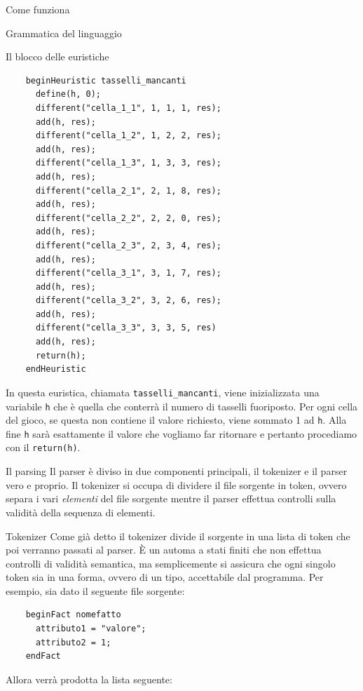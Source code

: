 \begin{chapter}{Come funziona}
\begin{section}{Grammatica del linguaggio}
\begin{subsection}{Il blocco delle euristiche}
    \begin{verbatim}
	beginHeuristic tasselli_mancanti
	  define(h, 0);
	  different("cella_1_1", 1, 1, 1, res);
	  add(h, res);
	  different("cella_1_2", 1, 2, 2, res);
	  add(h, res);
	  different("cella_1_3", 1, 3, 3, res);
	  add(h, res);
	  different("cella_2_1", 2, 1, 8, res);
	  add(h, res);
	  different("cella_2_2", 2, 2, 0, res);
	  add(h, res);
	  different("cella_2_3", 2, 3, 4, res);
	  add(h, res);
	  different("cella_3_1", 3, 1, 7, res);
	  add(h, res);
	  different("cella_3_2", 3, 2, 6, res);
	  add(h, res);
	  different("cella_3_3", 3, 3, 5, res)
	  add(h, res);
	  return(h);
	endHeuristic
    \end{verbatim}

    \noindent In questa euristica, chiamata \verb,tasselli_mancanti,, viene inizializzata una
    variabile \verb,h, che \`e quella che conterr\`a il numero di tasselli fuoriposto. Per
    ogni cella del gioco, se questa non contiene il valore richiesto, viene sommato 1 ad \verb,h,.
    Alla fine \verb,h, sar\`a esattamente il valore che vogliamo far ritornare e pertanto
    procediamo con il \verb,return(h),.

	\end{subsection}

\end{section}

\begin{section}{Il parsing}
\label{sec:parsing-overview}
Il parser \`e diviso in due componenti principali, il tokenizer e il parser vero e
proprio. Il tokenizer si occupa di dividere il file sorgente in token, ovvero separa
i vari \textit{elementi} del file sorgente mentre il parser effettua controlli sulla
validit\`a della sequenza di elementi.

	\begin{subsection}{Tokenizer}
	Come gi\`a detto il tokenizer divide il sorgente in una lista di token che poi
	verranno passati al parser. \`E un automa a stati finiti che non effettua controlli
	di validit\`a semantica, ma semplicemente si assicura che ogni singolo token sia
	in una forma, ovvero di un tipo, accettabile dal programma. Per esempio, sia dato
	il seguente file sorgente:

	\begin{verbatim}
	beginFact nomefatto
	  attributo1 = "valore";
	  attributo2 = 1;
	endFact
	\end{verbatim}

	\noindent Allora verr\`a prodotta la lista seguente:


\end{subsection}
\end{section}
\end{chapter}
